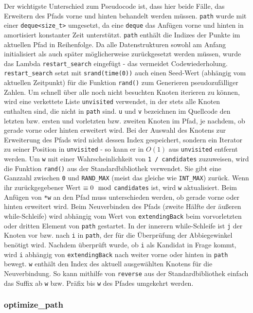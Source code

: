 \documentclass[a4paper, 10pt, ngerman]{article}
\begin{document}
Der wichtigste Unterschied zum Pseudocode ist, dass hier beide Fälle, das Erweitern des Pfads vorne und hinten behandelt werden müssen. \verb|path| wurde mit einer \verb|deque<size_t>| umgesetzt, da eine \verb|deque| das Anfügen vorne und hinten in amortisiert konstanter Zeit unterstützt. \verb|path| enthält die Indizes der Punkte im aktuellen Pfad in Reihenfolge. Da alle Datenstrukturen sowohl am Anfang initialisiert als auch später möglicherweise zurückgesetzt werden müssen, wurde das Lambda \verb|restart_search| eingefügt - das vermeidet Codewiederholung. \verb|restart_search| setzt mit \verb|srand(time(0))| auch einen Seed-Wert (abhängig vom aktuellen Zeitpunkt) für die Funktion \verb|rand()| zum Generieren pseudozufälliger Zahlen. Um schnell über alle noch nicht besuchten Knoten iterieren zu können, wird eine verkettete Liste \verb|unvisited| verwendet, in der stets alle Knoten enthalten sind, die nicht in \verb|path| sind. \verb|u| und \verb|v| bezeichnen im Quellcode den letzten bzw. ersten und vorletzten bzw. zweiten Knoten im Pfad, je nachdem, ob gerade vorne oder hinten erweitert wird. Bei der Auswahl des Knotens zur Erweiterung des Pfads wird nicht dessen Index gespeichert, sondern ein Iterator zu seiner Position in \verb|unvisited| - so kann er in $O(1)$ aus \verb|unvisited| entfernt werden. Um \verb|w| mit einer Wahrscheinlichkeit von \verb|1 / candidates| zuzuweisen, wird die Funktion \verb|rand()| aus der Standardbibliothek verwendet. Sie gibt eine Ganzzahl zwischen \verb|0| und \verb|RAND_MAX| (meist das gleiche wie \verb|INT_MAX|) zurück. Wenn ihr zurückgegebener Wert $\equiv 0 \mod$\verb|candidates| ist, wird \verb|w| aktualisiert. Beim Anfügen von \verb|*w| an den Pfad muss unterschieden werden, ob gerade vorne oder hinten erweitert wird. Beim Neuverbinden des Pfads (zweite Hälfte der äußeren while-Schleife) wird abhängig vom Wert von \verb|extendingBack| beim vorvorletzten oder dritten Element von \verb|path| gestartet. In der innerern while-Schleife ist \verb|j| der Knoten vor bzw. nach \verb|i| in \verb|path|, der für die Überprüfung der Abbiegewinkel benötigt wird. Nachdem überprüft wurde, ob \verb|i| als Kandidat in Frage kommt, wird \verb|i| abhängig von \verb|extendingBack| nach weiter vorne oder hinten in \verb|path| bewegt. \verb|w| enthält den Index des aktuell ausgewählten Knotens für die Neuverbindung. So kann mithilfe von \verb|reverse| aus der Standardbibliothek einfach das Suffix ab \verb|w| bzw. Präfix bis \verb|w| des Pfades umgekehrt werden.

\subsubsection{optimize\_path}
\end{document}
